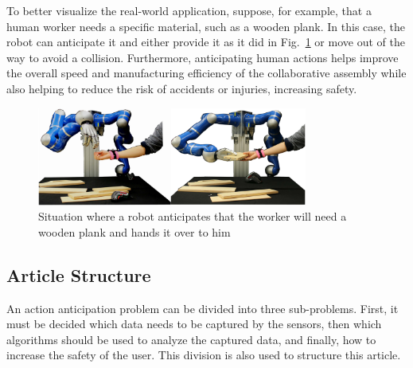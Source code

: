 {To better visualize the real-world application, suppose, for example, that a human worker needs a specific material, such as a wooden plank. In this case, the robot can anticipate it and either provide it as it did in Fig.~\ref{example} or move out of the way to avoid a collision. Furthermore, anticipating human actions helps improve the overall speed and manufacturing efficiency of the collaborative assembly while also helping to reduce the risk of accidents or injuries, increasing safety.

\begin{figure}[htbp]
\centerline{\includegraphics[width=3.5in]{figs/example.PNG}}
\caption{Situation where a robot anticipates that the worker will need a wooden plank and hands it over to him \cite{Maeda2016}}
\label{example}
\end{figure}

\subsection{Article Structure}

An action anticipation problem can be divided into three sub-problems. First, it must be decided which data needs to be captured by the sensors, then which algorithms should be used to analyze the captured data, and finally, how to increase the safety of the user. This division is also used to structure this article.
}